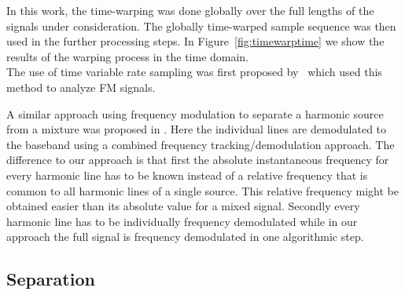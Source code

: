 In this work, the time-warping was done globally over the full lengths of the signals under consideration. 
The globally time-warped sample sequence was then used in the further processing steps. 
In Figure~\ref{fig:timewarptime} we show the results of the warping process in the time domain. \\

The use of time variable rate sampling was first proposed by~\cite{wulich92} which used this method to analyze FM signals.

A similar approach using frequency modulation to separate a harmonic source from a mixture was proposed in \cite{wang95}. 
Here the individual lines are demodulated to the baseband using a combined frequency tracking/demodulation approach. 
The difference to our approach is that first the absolute instantaneous frequency for every harmonic line has to be known instead of a relative frequency that is common to all harmonic lines of a single source. 
This relative frequency might be obtained easier than its absolute value for a mixed signal. 
Secondly every harmonic line has to be individually frequency demodulated while in our approach the full signal is frequency demodulated in one algorithmic step.\\

\subsection{Separation} %
\label{sub:pitch_variation_informed_source_separation}

